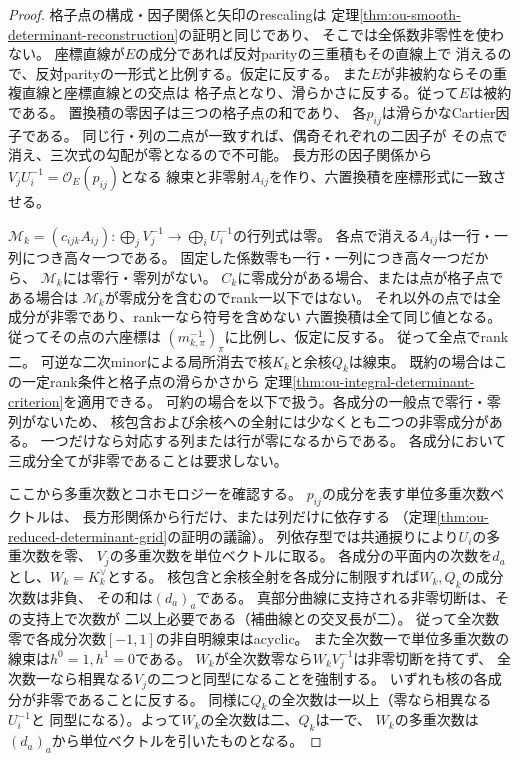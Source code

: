 \begin{proof}
格子点の構成・因子関係と矢印のrescalingは
定理\ref{thm:ou-smooth-determinant-reconstruction}の証明と同じであり、
そこでは全係数非零性を使わない。
座標直線が$E$の成分であれば反対parityの三重積もその直線上で
消えるので、反対parityの一形式と比例する。仮定に反する。
また$E$が非被約ならその重複直線と座標直線との交点は
格子点となり、滑らかさに反する。従って$E$は被約である。
置換積の零因子は三つの格子点の和であり、
各$p_{ij}$は滑らかなCartier因子である。
同じ行・列の二点が一致すれば、偶奇それぞれの二因子が
その点で消え、三次式の勾配が零となるので不可能。
長方形の因子関係から$V_jU_i^{-1}=\mathcal O_E(p_{ij})$となる
線束と非零射$A_{ij}$を作り、六置換積を座標形式に一致させる。

$\mathscr M_k=(c_{ijk}A_{ij}):\bigoplus_j V_j^{-1}\to
\bigoplus_i U_i^{-1}$の行列式は零。
各点で消える$A_{ij}$は一行・一列につき高々一つである。
固定した係数零も一行・一列につき高々一つだから、
$\mathscr M_k$には零行・零列がない。
$C_k$に零成分がある場合、または点が格子点である場合は
$\mathscr M_k$が零成分を含むのでrank一以下ではない。
それ以外の点では全成分が非零であり、rank一なら符号を含めない
六置換積は全て同じ値となる。従ってその点の六座標は
$(m_{k,\pi}^{-1})_\pi$に比例し、仮定に反する。
従って全点でrank二。
可逆な二次minorによる局所消去で核$K_k$と余核$Q_k$は線束。
既約の場合はこの一定rank条件と格子点の滑らかさから
定理\ref{thm:ou-integral-determinant-criterion}を適用できる。
可約の場合を以下で扱う。各成分の一般点で零行・零列がないため、
核包含および余核への全射には少なくとも二つの非零成分がある。
一つだけなら対応する列または行が零になるからである。
各成分において三成分全てが非零であることは要求しない。

ここから多重次数とコホモロジーを確認する。
$p_{ij}$の成分を表す単位多重次数ベクトルは、
長方形関係から行だけ、または列だけに依存する
（定理\ref{thm:ou-reduced-determinant-grid}の証明の議論）。
列依存型では共通捩りにより$U_i$の多重次数を零、
$V_j$の多重次数を単位ベクトルに取る。
各成分の平面内の次数を$d_a$とし、$W_k=K_k^\vee$とする。
核包含と余核全射を各成分に制限すれば$W_k,Q_k$の成分次数は非負、
その和は$(d_a)_a$である。
真部分曲線に支持される非零切断は、その支持上で次数が
二以上必要である（補曲線との交叉長が二）。
従って全次数零で各成分次数$[-1,1]$の非自明線束はacyclic。
また全次数一で単位多重次数の線束は$h^0=1,h^1=0$である。
$W_k$が全次数零なら$W_k V_j^{-1}$は非零切断を持てず、
全次数一なら相異なる$V_j$の二つと同型になることを強制する。
いずれも核の各成分が非零であることに反する。
同様に$Q_k$の全次数は一以上（零なら相異なる$U_i^{-1}$と
同型になる）。よって$W_k$の全次数は二、$Q_k$は一で、
$W_k$の多重次数は$(d_a)_a$から単位ベクトルを引いたものとなる。


\end{proof}
